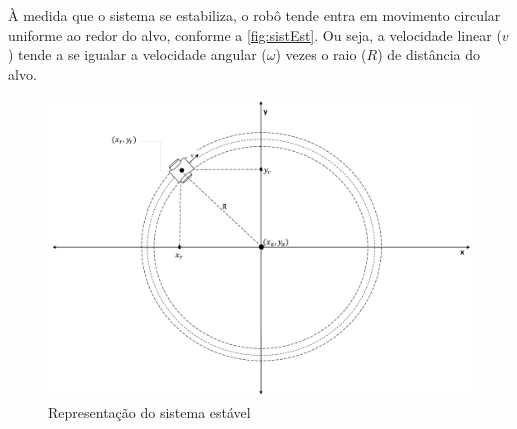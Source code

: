 À medida que o sistema se estabiliza, o robô tende entra em movimento circular uniforme ao redor do alvo, conforme a \autoref{fig:sistEst}. Ou seja, a velocidade linear ($v$) tende a se igualar a velocidade angular ($\omega$) vezes o raio ($R$) de distância do alvo. 

\begin{figure}[!htb]
	\centering
	\includegraphics[width=1.0\textwidth]{./04-figuras/sistEstavel2}
	\caption{Representação do sistema estável}
	\label{fig:sistEst}
\end{figure}





